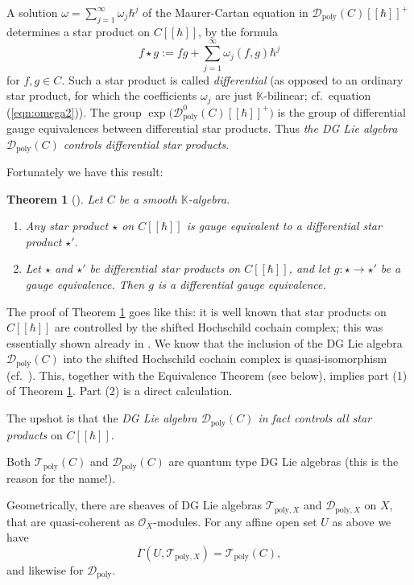 \documentclass{conm-p-l}
\newtheorem{thm}[equation]{Theorem}
\theoremstyle{definition}
\numberwithin{equation}{section}
\newcommand{\opn}{\operatorname}
\newcommand{\mcal}[1]{\mathcal{#1}}
\newcommand{\mrm}[1]{\mathrm{#1}}
\newcommand{\mbb}[1]{\mathbb{#1}}
\newcommand{\K}{\mbb{K}}
\begin{document}
A solution
$\omega = \sum_{j = 1}^{\infty} \omega_j \hbar^j$
of the Maurer-Cartan equation in 
$\mcal{D}_{\mrm{poly}}(C)[[\hbar]]^+$ 
determines a star product on $C[[\hbar]]$, by the formula
\begin{equation} \label{eqn:beta}
f \star g := f g + 
\sum_{j = 1}^{\infty} \omega_j(f, g) \hbar^j
\end{equation}
for $f, g \in C$. 
Such a star product is called {\em differential} (as opposed to an ordinary star
product, for which the coefficients $\omega_j$ are just $\K$-bilinear; cf.\
equation (\ref{eqn:omega2})). The group 
$\opn{exp} \bigl( \mcal{D}^{0}_{\mrm{poly}}(C)[[\hbar]]^+ \bigr)$
is the group of differential gauge equivalences between differential star
products. Thus {\em the DG Lie algebra $\mcal{D}_{\mrm{poly}}(C)$ 
controls differential star products}.

Fortunately we have this result:

\begin{thm}[\cite{Ye5}] \label{thm:diff}
Let $C$ be a smooth $\K$-algebra. 
\begin{enumerate}
\item Any star product $\star$ on $C[[\hbar]]$ is gauge equivalent to a
differential star product $\star'$.

\item Let $\star$ and $\star'$ be differential star products on $C[[\hbar]]$, 
and let $g : \star \to \star'$ be a gauge equivalence. Then $g$ is a
differential gauge equivalence.
\end{enumerate}
\end{thm}

The proof of Theorem \ref{thm:diff} goes like this: it is well known that star
products on $C[[\hbar]]$ are controlled by the shifted Hochschild cochain
complex; this was essentially shown already in \cite{Ge}. We know that the
inclusion of the DG Lie algebra $\mcal{D}_{\mrm{poly}}(C)$ into the 
shifted Hochschild cochain complex is quasi-isomorphism (cf.\ \cite{Ye3}). 
This, together with the Equivalence Theorem (see below), implies
part (1) of Theorem \ref{thm:diff}. Part (2) is a direct calculation. 

The upshot is that the {\em DG Lie algebra 
$\mcal{D}_{\mrm{poly}}(C)$ in fact controls all star products} on $C[[\hbar]]$.

Both $\mcal{T}_{\mrm{poly}}(C)$ and $\mcal{D}_{\mrm{poly}}(C)$ are quantum type
DG Lie algebras (this is the reason for the name!).

Geometrically, there are sheaves of DG Lie algebras
$\mcal{T}_{\mrm{poly}, X}$ and $\mcal{D}_{\mrm{poly}, X}$
on $X$, that are quasi-coherent as $\mcal{O}_X$-modules. 
For any affine open set $U$ as above we have
\[ \Gamma(U, \mcal{T}_{\mrm{poly}, X}) = \mcal{T}_{\mrm{poly}}(C) , 
\]
and likewise for $\mcal{D}_{\mrm{poly}}$.
\end{document}
